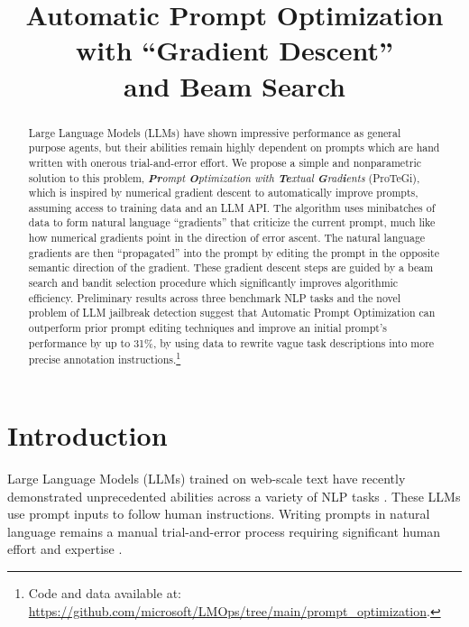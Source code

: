 \title{Automatic Prompt Optimization with ``Gradient Descent'' \\and Beam Search}



\maketitle

\begin{abstract}
Large Language Models (LLMs) have shown impressive performance as general purpose agents, but their abilities remain highly dependent on prompts which are hand written with onerous trial-and-error effort. We propose a simple and nonparametric solution to this problem, \emph{\textbf{Pr}ompt \textbf{O}ptimization with \textbf{Te}xtual \textbf{G}rad\textbf{i}ents} (ProTeGi), which is inspired by numerical gradient descent to automatically improve prompts, assuming access to training data and an LLM API. The algorithm uses minibatches of data to form natural language ``gradients'' that criticize the current prompt, much like how numerical gradients point in the direction of error ascent. The natural language gradients are then ``propagated'' into the prompt by editing the prompt in the opposite semantic direction of the gradient. These gradient descent steps are guided by a beam search and bandit selection procedure which significantly improves algorithmic efficiency. Preliminary results across three benchmark NLP tasks and the novel problem of LLM jailbreak detection suggest that Automatic Prompt Optimization can outperform prior prompt editing techniques and improve an initial prompt's performance by up to 31\%, by using data to rewrite vague task descriptions into more precise annotation instructions.\footnote{Code and data available at: \url{https://github.com/microsoft/LMOps/tree/main/prompt_optimization}.}
\end{abstract}

\section{Introduction}
Large Language Models (LLMs) trained on web-scale text have recently demonstrated unprecedented abilities across a variety of NLP tasks \cite{gpt4,bubeck2023sparks}. 
These LLMs use prompt inputs to follow human instructions. Writing prompts in natural language remains a manual trial-and-error process requiring significant human effort \cite{jiang2022promptmaker} and expertise \cite{reynolds2021prompt,zamfirescu2023johnny}.


